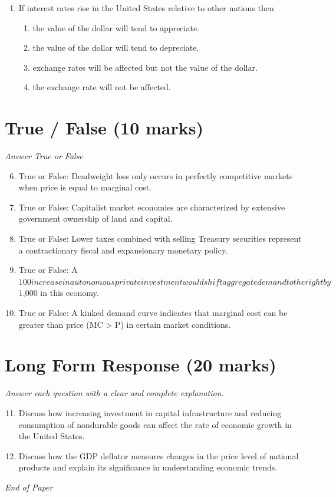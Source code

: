 \documentclass[12pt]{article}
\begin{document}
\begin{enumerate}[label=\arabic*.]
\begin{enumerate}[label=(\alph*)]
    \item Increasing the reserve ratio
    \item Buying government securities
    \item Lowering tariffs
\end{enumerate}
\item If interest rates rise in the United States relative to other nations then
\begin{enumerate}[label=(\alph*)]
    \item the value of the dollar will tend to appreciate.
    \item the value of the dollar will tend to depreciate.
    \item exchange rates will be affected but not the value of the dollar.
    \item the exchange rate will not be affected.
\end{enumerate}
\end{enumerate}

\section*{True / False (10 marks)}
\textit{Answer True or False}
\begin{enumerate}[label=\arabic*.]
\setcounter{enumi}{5}
\item True or False: Deadweight loss only occurs in perfectly competitive markets when price is equal to marginal cost.
\item True or False: Capitalist market economies are characterized by extensive government ownership of land and capital.
\item True or False: Lower taxes combined with selling Treasury securities represent a contractionary fiscal and expansionary monetary policy.
\item True or False: A $100 increase in autonomous private investment would shift aggregate demand to the right by $1,000 in this economy.
\item True or False: A kinked demand curve indicates that marginal cost can be greater than price (MC \textgreater{} P) in certain market conditions.
\end{enumerate}

\section*{Long Form Response (20 marks)}
\textit{Answer each question with a clear and complete explanation.}
\begin{enumerate}[label=\arabic*.]
\setcounter{enumi}{10}
\item Discuss how increasing investment in capital infrastructure and reducing consumption of nondurable goods can affect the rate of economic growth in the United States.
\item Discuss how the GDP deflator measures changes in the price level of national products and explain its significance in understanding economic trends.
\end{enumerate}

\vfill
\noindent\textit{End of Paper}
\end{document}
